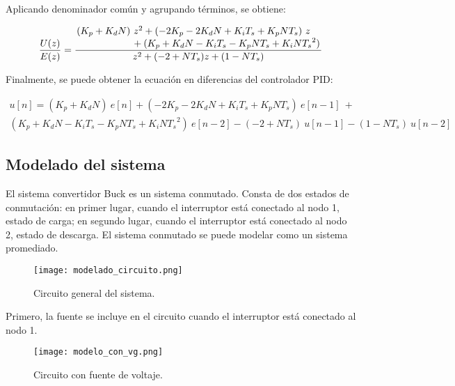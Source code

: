 Aplicando denominador común y agrupando términos, se obtiene:

\vspace{-0.5cm}
\begin{equation}
    \dfrac{U(z)}{E(z)} =
    \frac
    {
        \splitfrac{
            (K_p + K_d N)\ z^2 + (-2 K_p - 2 K_d N + K_i T_s + K_p N T_s)\ z
        }{
            + (K_p + K_d N - K_i T_s - K_p N T_s + K_i N {T_s}^2)
        }
    }
    {
            z^2 + (-2 + N T_s) z + (1 - N T_s)
    }
    \end{equation}
\vspace{-0.5cm}

Finalmente, se puede obtener la ecuación en diferencias del controlador PID:

\vspace{-0.5cm}
\begin{multline}
        u[n] = (K_p + K_d N)\ e[n] + (-2 K_p - 2 K_d N + K_i T_s + K_p N T_s)\ e[n-1]\  + \\
    (K_p + K_d N - K_i T_s - K_p N T_s + K_i N {T_s}^2)\ e[n-2] - (-2 + N T_s)\ u[n-1] - (1 - N T_s)\ u[n-2]
\end{multline}
\vspace{-0.5cm}

\vspace{-0.5cm}
\subsection{\textbf{Modelado del sistema}}
\vspace{-0.5cm}

El sistema convertidor Buck es un sistema conmutado. Consta de dos estados de conmutación: 
en primer lugar, cuando el interruptor está conectado al nodo 1, estado de carga; en segundo lugar, cuando
el interruptor está conectado al nodo 2, estado de descarga.
El sistema conmutado se puede modelar como un sistema promediado.

\begin{figure}[H]
    \centering
    \texttt{[image: modelado\_circuito.png]}
    \vspace{-0.25cm}
    \caption{Circuito general del sistema.}
    \label{fig:modelado_circuito}
\end{figure}
\vspace{-0.5cm}

Primero, la fuente se incluye en el circuito cuando el interruptor está conectado al nodo 1.

\begin{figure}[H]
    \centering
    \texttt{[image: modelo\_con\_vg.png]}
    \vspace{-0.25cm}
    \caption{Circuito con fuente de voltaje.}
    \label{fig:modelado_con_vg}
\end{figure}
\vspace{-0.5cm}

